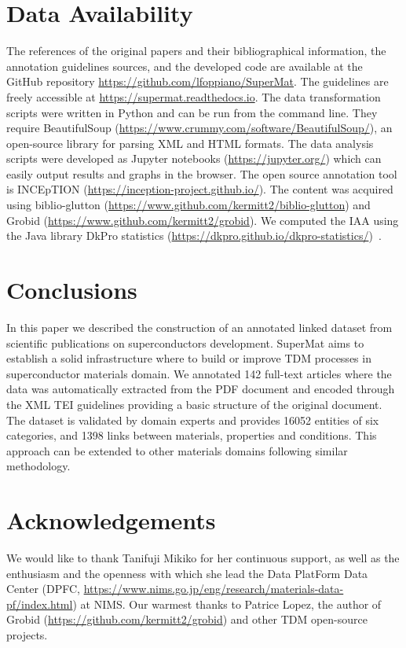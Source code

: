 \documentclass[]{interact}
\theoremstyle{plain}%
\theoremstyle{definition}
\theoremstyle{remark}
\begin{document}
\section{Data Availability}
\label{sec:code-availability}
The references of the original papers and their bibliographical information, the annotation guidelines sources, and the developed code are available at the GitHub repository \url{https://github.com/lfoppiano/SuperMat}. The guidelines are freely accessible at \url{https://supermat.readthedocs.io}.
The data transformation scripts were written in Python and can be run from the command line. 
They require BeautifulSoup  (\url{https://www.crummy.com/software/BeautifulSoup/}), an open-source library for parsing XML and HTML formats. 
The data analysis scripts were developed as Jupyter notebooks (\url{https://jupyter.org/}) which can easily output results and graphs in the browser. 
The open source annotation tool is INCEpTION (\url{https://inception-project.github.io/}). 
The content was acquired using biblio-glutton (\url{https://www.github.com/kermitt2/biblio-glutton}) and Grobid (\url{https://www.github.com/kermitt2/grobid}).
We computed the IAA using the Java library DkPro statistics (\url{https://dkpro.github.io/dkpro-statistics/})~\cite{Meyer2014DKProAA}.

\section{Conclusions}

In this paper we described the construction of an annotated linked dataset from scientific publications on superconductors development. 
SuperMat aims to establish a solid infrastructure where to build or improve TDM processes in superconductor materials domain.
We annotated 142 full-text articles where the data was automatically extracted from the PDF document and encoded through the XML TEI guidelines providing a basic structure of the original document. 
The dataset is validated by domain experts and provides 16052 entities of six categories, and 1398 links between materials, properties and conditions. 
This approach can be extended to other materials domains following similar methodology.


\section*{Acknowledgements}

We would like to thank Tanifuji Mikiko for her continuous support, as well as the enthusiasm and the openness with which she lead the Data PlatForm Data Center (DPFC, \url{https://www.nims.go.jp/eng/research/materials-data-pf/index.html}) at NIMS.
Our warmest thanks to Patrice Lopez, the author of Grobid (\url{https://github.com/kermitt2/grobid}) and other TDM open-source projects. 
\end{document}
